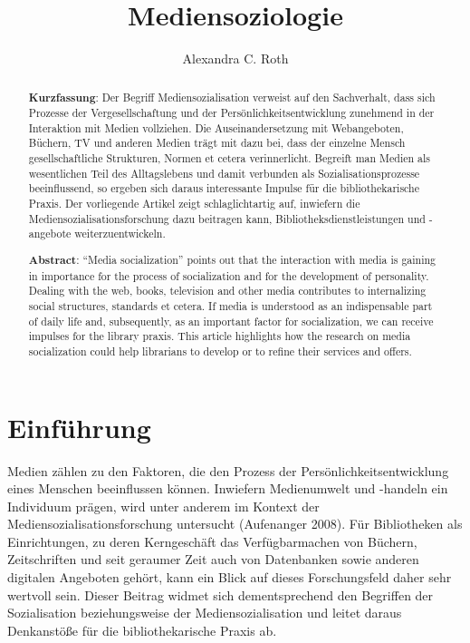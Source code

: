 \documentclass[a4paper,
fontsize=11pt,
oneside,
numbers=noperiodatend,
parskip=half-,
bibliography=totoc,
final
]{scrartcl}
\title{\LARGE{Mediensoziologie}}%
\author{Alexandra C. Roth} %
\date{}
\begin{document}
\maketitle
\thispagestyle{fancyplain} 

\begin{abstract}
\noindent
\textbf{Kurzfassung}: Der Begriff Mediensozialisation verweist auf den
Sachverhalt, dass sich Prozesse der Vergesellschaftung und der
Persönlichkeitsentwicklung zunehmend in der Interaktion mit Medien
vollziehen. Die Auseinandersetzung mit Webangeboten, Büchern, TV und
anderen Medien trägt mit dazu bei, dass der einzelne Mensch
gesellschaftliche Strukturen, Normen et cetera verinnerlicht. Begreift
man Medien als wesentlichen Teil des Alltagslebens und damit verbunden
als Sozialisationsprozesse beeinflussend, so ergeben sich daraus
interessante Impulse für die bibliothekarische Praxis. Der vorliegende
Artikel zeigt schlaglichtartig auf, inwiefern die
Mediensozialisationsforschung dazu beitragen kann,
Bibliotheksdienstleistungen und -angebote weiterzuentwickeln.

\noindent \textbf{Abstract}: \enquote{Media socialization} points out that the
interaction with media is gaining in importance for the process of
socialization and for the development of personality. Dealing with the
web, books, television and other media contributes to internalizing
social structures, standards et cetera. If media is understood as an
indispensable part of daily life and, subsequently, as an important
factor for socialization, we can receive impulses for the library
praxis. This article highlights how the research on media socialization
could help librarians to develop or to refine their services and offers.
\end{abstract}

\hypertarget{einfuxfchrung}{%
\section{Einführung}\label{einfuxfchrung}}

Medien zählen zu den Faktoren, die den Prozess der
Persönlichkeitsentwicklung eines Menschen beeinflussen können. Inwiefern
Medienumwelt und -handeln ein Individuum prägen, wird unter anderem im
Kontext der Mediensozialisationsforschung untersucht (Aufenanger 2008).
Für Bibliotheken als Einrichtungen, zu deren Kerngeschäft das
Verfügbarmachen von Büchern, Zeitschriften und seit geraumer Zeit auch
von Datenbanken sowie anderen digitalen Angeboten gehört, kann ein Blick
auf dieses Forschungsfeld daher sehr wertvoll sein. Dieser Beitrag
widmet sich dementsprechend den Begriffen der Sozialisation
beziehungsweise der Mediensozialisation und leitet daraus Denkanstöße
für die bibliothekarische Praxis ab.
\end{document}
